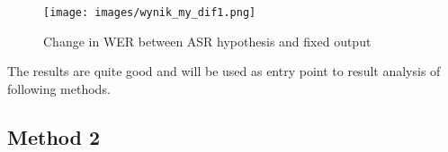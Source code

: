 \documentclass[a4paper,11pt,twoside]{report}
\theoremstyle{definition}
\begin{document}
\begin{figure}[H]{}
    \centering
    \texttt{[image: images/wynik\_my\_dif1.png]}
    \caption{Change in WER between ASR hypothesis and fixed output}
    \label{img:wynikmydif}
\end{figure}

The results are quite good and will be used as entry point to result analysis of following methods.

\subsection{Method 2}




\end{document}
